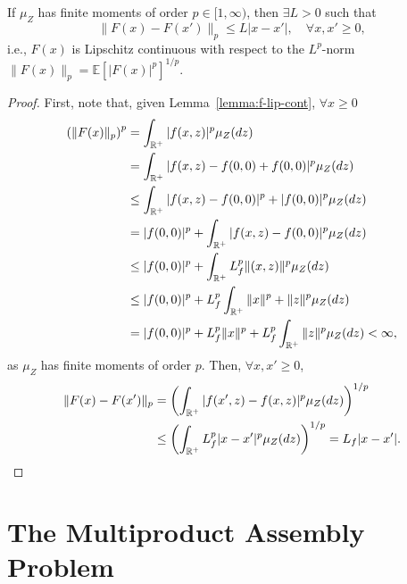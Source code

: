 \documentclass[12pt]{article}
\begin{document}
\begin{lemma}[\citet{burtscheidtBilevelLinearOptimization2020}, Lemma~17.2.4\footnote{Except the case for probability measures with finite moments of order $p=\infty$.}] 
    If $\mu_Z$ has finite moments of order $p\in [1,\infty)$, then $\exists L>0$ such that \[
	\|F(x) - F(x')\|_p \le L |x - x'|,\quad \forall x,x' \ge 0
    ,\] i.e., $F(x)$ is Lipschitz continuous with respect to the $L^p$-norm $\|F(x)\|_p = \mathbb{E}[|F(x)|^{p}]^{1 / p}$.
\end{lemma}
\begin{proof}
    First, note that, given Lemma~\ref{lemma:f-lip-cont}, $\forall x \ge 0$
    \begin{align*}
	\left( \|F(x)\|_p \right)^{p} &= \int_{\mathbb{R}^+} |f(x,z)|^{p} \mu_Z(dz)  \\
	&= \int_{\mathbb{R}^+} |f(x,z) - f(0,0) + f(0,0)|^{p} \mu_Z(dz)  \\
	&\le  \int_{\mathbb{R}^+} |f(x,z) - f(0,0)|^{p} + |f(0,0)|^{p} \mu_Z(dz)  \\
	&=  |f(0,0)|^{p} + \int_{\mathbb{R}^+} |f(x,z) - f(0,0)|^{p} \mu_Z(dz) \\
	&\le |f(0,0)|^{p} + \int_{\mathbb{R}^+} L_f^{p} \|(x,z)\|^{p} \mu_Z(dz) \\
	&\le |f(0,0)|^{p} + L_f^{p} \int_{\mathbb{R}^+} \|x\|^{p} + \|z\|^{p} \mu_Z(dz) \\
	&= |f(0,0)|^{p} + L_f^{p} \|x\|^{p} + L_f^{p} \int_{\mathbb{R}^+}\|z\|^{p} \mu_Z(dz) < \infty
    ,\end{align*}
    as $\mu_Z$ has finite moments of order $p$.
    Then, $\forall x,x'\ge 0$,
    \begin{align*}
        \|F(x) - F(x')\|_{p} &= \left( \int_{\mathbb{R}^{+}} |f(x',z) - f(x,z)|^{p}\mu_Z(dz) \right)^{1 / p} \\ 
	&\le \left( \int_{\mathbb{R}^{+}} L_f^{p} |x - x'|^{p}\mu_Z(dz) \right)^{1 / p} = L_f |x-x'|
    .\end{align*}
\end{proof}

\section*{The Multiproduct Assembly Problem}
\end{document}
